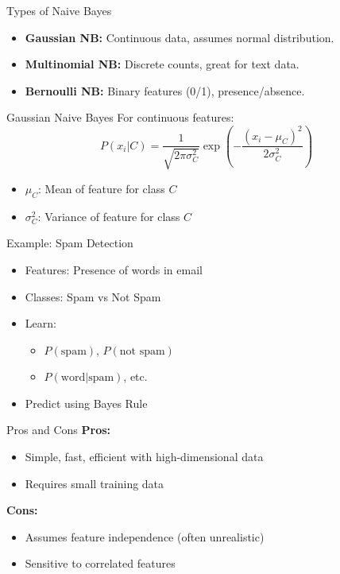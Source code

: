 \documentclass{beamer}
\begin{document}
\begin{frame}{Types of Naive Bayes}
  \begin{itemize}
    \item \textbf{Gaussian NB:} Continuous data, assumes normal distribution.
    \item \textbf{Multinomial NB:} Discrete counts, great for text data.
    \item \textbf{Bernoulli NB:} Binary features (0/1), presence/absence.
  \end{itemize}
\end{frame}

\begin{frame}{Gaussian Naive Bayes}
  For continuous features:
  \[
  P(x_i | C) = \frac{1}{\sqrt{2\pi\sigma_C^2}} \exp\left(-\frac{(x_i - \mu_C)^2}{2\sigma_C^2}\right)
  \]
  \begin{itemize}
    \item $\mu_C$: Mean of feature for class $C$
    \item $\sigma_C^2$: Variance of feature for class $C$
  \end{itemize}
\end{frame}

\begin{frame}{Example: Spam Detection}
  \begin{itemize}
    \item Features: Presence of words in email
    \item Classes: Spam vs Not Spam
    \item Learn:
    \begin{itemize}
      \item $P(\text{spam})$, $P(\text{not spam})$
      \item $P(\text{word}|\text{spam})$, etc.
    \end{itemize}
    \item Predict using Bayes Rule
  \end{itemize}
\end{frame}

\begin{frame}{Pros and Cons}
  \textbf{Pros:}
  \begin{itemize}
    \item Simple, fast, efficient with high-dimensional data
    \item Requires small training data
  \end{itemize}
  \textbf{Cons:}
  \begin{itemize}
    \item Assumes feature independence (often unrealistic)
    \item Sensitive to correlated features
  \end{itemize}
\end{frame}
\end{document}
